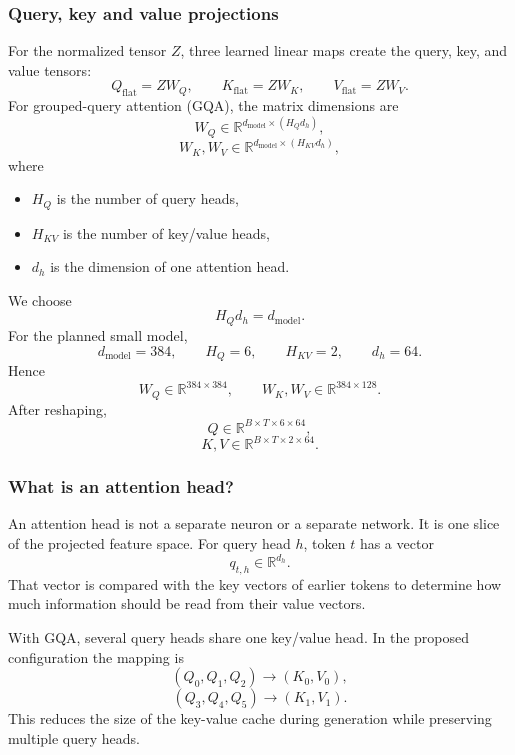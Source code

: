 \documentclass[11pt]{article}
\begin{document}
\subsubsection{Query, key and value projections}
For the normalized tensor $Z$, three learned linear maps create the query, key,
and value tensors:
\[
Q_{\mathrm{flat}}=ZW_Q,
\qquad
K_{\mathrm{flat}}=ZW_K,
\qquad
V_{\mathrm{flat}}=ZW_V.
\]
For grouped-query attention (GQA), the matrix dimensions are
\[
W_Q\in\mathbb{R}^{d_{\mathrm{model}}\times(H_Qd_h)},
\]
\[
W_K,W_V\in\mathbb{R}^{d_{\mathrm{model}}\times(H_{KV}d_h)},
\]
where
\begin{itemize}[leftmargin=1.5em]
    \item $H_Q$ is the number of query heads,
    \item $H_{KV}$ is the number of key/value heads,
    \item $d_h$ is the dimension of one attention head.
\end{itemize}
We choose
\[
H_Qd_h=d_{\mathrm{model}}.
\]
For the planned small model,
\[
d_{\mathrm{model}}=384,\qquad H_Q=6,\qquad H_{KV}=2,\qquad d_h=64.
\]
Hence
\[
W_Q\in\mathbb{R}^{384\times384},
\qquad
W_K,W_V\in\mathbb{R}^{384\times128}.
\]
After reshaping,
\[
Q\in\mathbb{R}^{B\times T\times6\times64},
\]
\[
K,V\in\mathbb{R}^{B\times T\times2\times64}.
\]

\subsubsection{What is an attention head?}
An attention head is not a separate neuron or a separate network. It is one slice
of the projected feature space.  For query head $h$, token $t$ has a vector
\[
q_{t,h}\in\mathbb{R}^{d_h}.
\]
That vector is compared with the key vectors of earlier tokens to determine how
much information should be read from their value vectors.

With GQA, several query heads share one key/value head.  In the proposed
configuration the mapping is
\[
(Q_0,Q_1,Q_2)\longrightarrow(K_0,V_0),
\]
\[
(Q_3,Q_4,Q_5)\longrightarrow(K_1,V_1).
\]
This reduces the size of the key-value cache during generation while preserving
multiple query heads.
\end{document}
